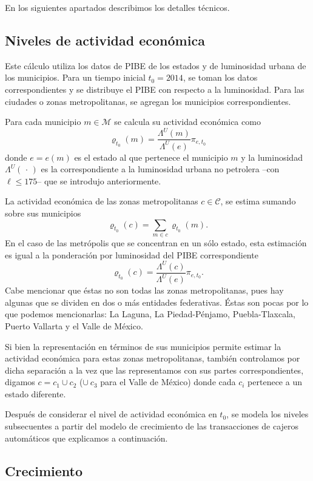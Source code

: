 \documentclass[]{article}
\begin{document}
En los siguientes apartados describimos los detalles técnicos.

\subsection{Niveles de actividad
económica}\label{niveles-de-actividad-economica}

Este cálculo utiliza los datos de PIBE de los estados y de luminosidad
urbana de los municipios. Para un tiempo inicial \(t_0 = 2014\), se
toman los datos correspondientes y se distribuye el PIBE con respecto a
la luminosidad. Para las ciudades o zonas metropolitanas, se agregan los
municipios correspondientes.

Para cada municipio \(m \in \mathcal M\) se calcula su actividad
económica como
\[ \mathrm{\varrho}_{t_0}(m) = \frac{\Lambda^{U}(m)}{\Lambda^{U}(e)} \pi_{e,t_0}\]
donde \(e = e(m)\) es el estado al que pertenece el municipio \(m\) y la
luminosidad \(\Lambda^U(\,\cdot\,)\) es la correspondiente a la
luminosidad urbana no petrolera --con \(\ell \leq 175\)-- que se
introdujo anteriormente.

La actividad económica de las zonas metropolitanas \(c \in \mathcal C\),
se estima sumando sobre sus municipios
\[ \varrho_{t_0}(c)=\sum_{m \in c}\varrho_{t_0}(m).\] En el caso de las
metrópolis que se concentran en un sólo estado, esta estimación es igual
a la ponderación por luminosidad del PIBE correspondiente
\[ \varrho_{t_0}(c)=\frac{\Lambda^U(c)}{\Lambda^U(e)}\pi_{e,t_0}.\] Cabe
mencionar que éstas no son todas las zonas metropolitanas, pues hay
algunas que se dividen en dos o más entidades federativas. Éstas son
pocas por lo que podemos mencionarlas: La Laguna, La Piedad-Pénjamo,
Puebla-Tlaxcala, Puerto Vallarta y el Valle de México.

Si bien la representación en términos de sus municipios permite estimar
la actividad económica para estas zonas metropolitanas, también
controlamos por dicha separación a la vez que las representamos con sus
partes correspondientes, digamos \(c=c_1\cup c_2\) (\(\cup\ c_3\) para
el Valle de México) donde cada \(c_i\) pertenece a un estado diferente.

Después de considerar el nivel de actividad económica en \(t_0\), se
modela los niveles subsecuentes a partir del modelo de crecimiento de
las transacciones de cajeros automáticos que explicamos a continuación.

\subsection{Crecimiento}\label{crecimiento}
\end{document}
